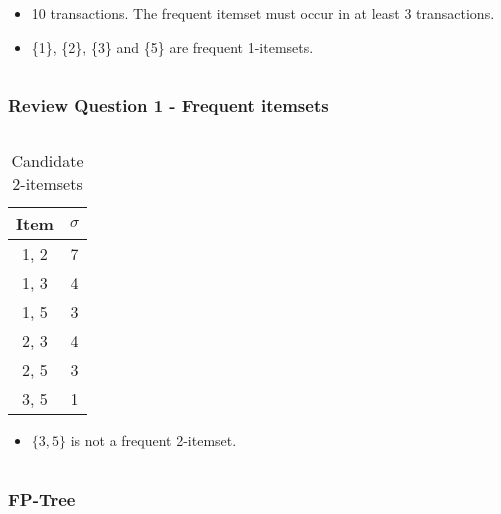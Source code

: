 \documentclass[aspectratio=169, 10pt]{beamer}
\begin{document}
\begin{frame}[t]
\begin{columns}
\begin{column}{0.5\textwidth}
        \begin{itemize}
            \item 10 transactions. The frequent itemset must occur in at least 3 transactions.
            \item \{1\}, \{2\}, \{3\} and \{5\} are frequent 1-itemsets.
        \end{itemize}
    \end{column}
\end{columns}

\end{frame}

\begin{frame}[t]
\frametitle{Review Question 1 - Frequent itemsets}
\small

\begin{columns}
    \begin{column}{0.5\textwidth} 
        \begin{table}[]
            \caption{Candidate 2-itemsets}
            \begin{tabular}{c|c}
            Item                       &  $\sigma$                \\ \hline
            1, 2                       & 7                        \\
            1, 3                       & 4                        \\
            1, 5                       & 3                        \\
            2, 3                       & 4                        \\
            2, 5                       & 3                        \\
            {\color[HTML]{FE0000} 3, 5} & {\color[HTML]{FE0000} 1}
            \end{tabular}
        \end{table}

        \begin{itemize}
            \item $\{3, 5\}$ is not a frequent 2-itemset.
        \end{itemize}
    \end{column}
    \begin{column}{0.5\textwidth} %


    \end{column}
\end{columns}

\end{frame}

\begin{frame}[t]
    \frametitle{}
        
        
\end{frame}

\begin{frame}[t]
\frametitle{FP-Tree}
    
    
\end{frame}
\end{document}
